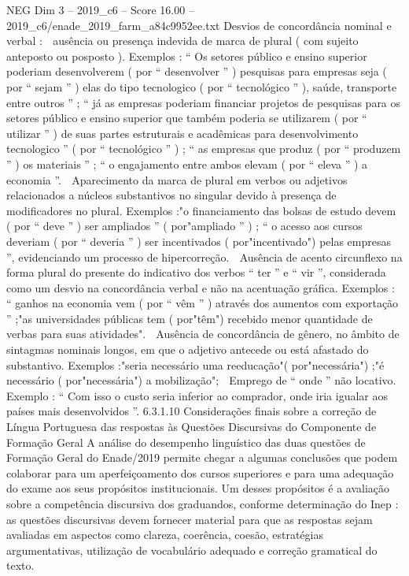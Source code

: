 \begin{textsample}{NEG Dim 3 – 2019\_c6 – Score 16.00 – 2019\_c6/enade\_2019\_farm\_a84c9952ee.txt}
Desvios de concordância nominal e verbal :  ausência ou presença indevida de marca de plural ( com sujeito anteposto ou posposto ).
Exemplos : “ Os setores público e ensino superior poderiam desenvolverem ( por “ desenvolver ” ) pesquisas para empresas seja ( por “ sejam ” ) elas do tipo tecnologico ( por “ tecnológico ” ), saúde, transporte entre outros ” ; “ já as empresas poderiam financiar projetos de pesquisas para os setores público e ensino superior que também poderia se utilizarem ( por “ utilizar ” ) de suas partes estruturais e acadêmicas para desenvolvimento tecnologico ” ( por “ tecnológico ” ) ; “ as empresas que produz ( por “ produzem ” ) os materiais ” ; “ o engajamento entre ambos elevam ( por “ eleva ” ) a economia ”.  Aparecimento da marca de plural em verbos ou adjetivos relacionados a núcleos substantivos no singular devido à presença de modificadores no plural.
Exemplos :"o financiamento das bolsas de estudo devem ( por “ deve ” ) ser ampliados ” ( por"ampliado ” ) ; “ o acesso aos cursos deveriam ( por “ deveria ” ) ser incentivados ( por"incentivado") pelas empresas ”, evidenciando um processo de hipercorreção.  Ausência de acento circunflexo na forma plural do presente do indicativo dos verbos “ ter ” e “ vir ”, considerada como um desvio na concordância verbal e não na acentuação gráfica.
Exemplos : “ ganhos na economia vem ( por “ vêm ” ) através dos aumentos com exportação ” ;"as universidades públicas tem ( por"têm") recebido menor quantidade de verbas para suas atividades".  Ausência de concordância de gênero, no âmbito de sintagmas nominais longos, em que o adjetivo antecede ou está afastado do substantivo.
Exemplos :"seria necessário uma reeducação"( por"necessária") ;"é necessário ( por"necessária") a mobilização";  Emprego de “ onde ” não locativo.
Exemplo : “ Com isso o custo seria inferior ao comprador, onde iria igualar aos países mais desenvolvidos ”. 6.3.1.10 Considerações finais sobre a correção de Língua Portuguesa das respostas às Questões Discursivas do Componente de Formação Geral A análise do desempenho linguístico das duas questões de Formação Geral do Enade/2019 permite chegar a algumas conclusões que podem colaborar para um aperfeiçoamento dos cursos superiores e para uma adequação do exame aos seus propósitos institucionais.
Um desses propósitos é a avaliação sobre a competência discursiva dos graduandos, conforme determinação do Inep : as questões discursivas devem fornecer material para que as respostas sejam avaliadas em aspectos como clareza, coerência, coesão, estratégias argumentativas, utilização de vocabulário adequado e correção gramatical do texto.

\end{textsample}
